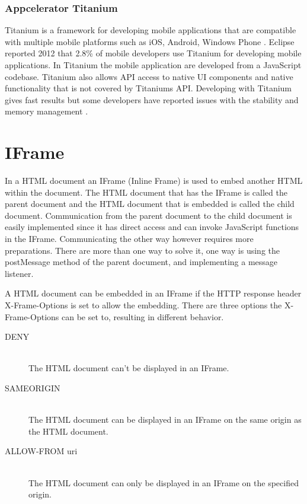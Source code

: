 \subsubsection{Appcelerator Titanium}\label{subsec:appcelerator-titanium}
Titanium is a framework for developing mobile applications that are compatible with multiple mobile platforms such as iOS, Android, Windows Phone \cite{titanium15}. Eclipse reported 2012 that 2.8\% of mobile developers use Titanium for developing mobile applications. In Titanium the mobile application are developed from a JavaScript codebase. Titanium also allows API access to native UI components and native functionality that is not covered by Titaniums API. Developing with Titanium gives fast results but some developers have reported issues with the stability and memory management \cite{stay-away1-titanium15} \cite{stay-away2-titanium15}. 

\section{IFrame}\label{sec:iframe}
In a HTML document an IFrame (Inline Frame) is used to embed another HTML within the document. The HTML document that has the IFrame is called the parent document and the HTML document that is embedded is called the child document. Communication from the parent document to the child document is easily implemented since it has direct access and can invoke JavaScript functions in the IFrame. Communicating the other way however requires more preparations. There are more than one way to solve it, one way is using the postMessage method of the parent document, and implementing a message listener.

A HTML document can be embedded in an IFrame if the HTTP response header X-Frame-Options is set to allow the embedding. There are three options the X-Frame-Options can be set to, resulting in different behavior. 
\begin{description}
 \item[DENY] \hfill \\
	The HTML document can't be displayed in an IFrame. 
\item[SAMEORIGIN] \hfill \\
	The HTML document can be displayed in an IFrame on the same origin as the HTML document. 
\item[ALLOW-FROM uri] \hfill \\
	The HTML document can only be displayed in an IFrame on the specified origin. 
\end{description}

